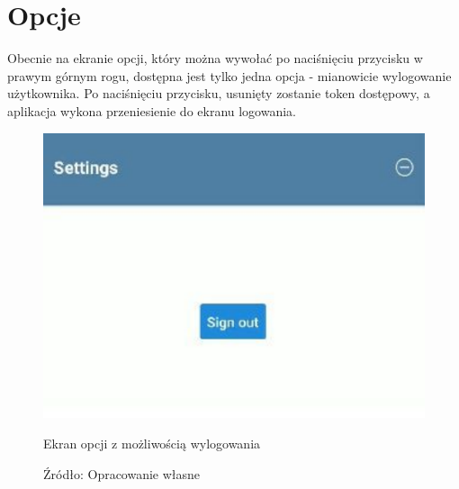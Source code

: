 \section{Opcje}
Obecnie na ekranie opcji, który można wywołać po naciśnięciu przycisku w prawym górnym rogu, dostępna jest tylko jedna opcja - mianowicie wylogowanie użytkownika. Po naciśnięciu przycisku, usunięty zostanie token dostępowy, a aplikacja wykona przeniesienie do ekranu logowania.
\begin{figure}[H]
	\centering
	\includegraphics{options.pdf}
	\caption{\centering Ekran opcji z możliwością wylogowania}
	\caption*{\centering Źródło: {Opracowanie własne}}
\end{figure}


